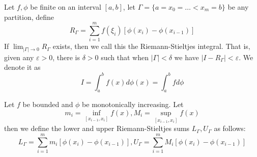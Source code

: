 \documentclass[openany]{book}
\begin{document}
\begin{defn}
    Let $f,\phi$ be finite on an interval $[a,b]$, let $\Gamma=\{a=x_0=\dots<x_m=b\}$ be any partition, define 
    \begin{equation*}
        R_\Gamma=\sum_{i=1}^mf(\xi_i)\left[\phi(x_i)-\phi(x_{i-1})\right]
    \end{equation*}
    If $\lim_{|\Gamma|\to0}R_\Gamma$ exists, then we call this the Riemann-Stieltjes integral. That is, given any $\varepsilon>0$, there is $\delta>0$ such that when $|\Gamma|<\delta$ we have $|I-R_\Gamma|<\varepsilon$. We denote it as 
    \begin{equation*}
        I=\int_a^bf(x)d\phi(x)=\int_a^b fd\phi
    \end{equation*}
\end{defn}
\begin{defn}
    Let $f$ be bounded and $\phi$ be monotonically increasing. Let 
    \begin{equation*}
        m_i=\inf_{[x_{i-1},x_i]}f(x), M_i=\sup_{[x_{i-1}, x_i]}f(x)
    \end{equation*}
    then we define the lower and upper Riemann-Stieltjes sums $L_\Gamma, U_\Gamma$ as follows:
    \begin{equation*}
        L_\Gamma=\sum_{i=1}^mm_i[\phi(x_i)-\phi(x_{i-1})], U_\Gamma=\sum_{i=1}^mM_i[\phi(x_i)-\phi(x_{i-1})]
    \end{equation*}

\end{defn}
\end{document}

